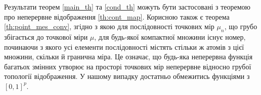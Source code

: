 Результати теорем \ref{main_th} та \ref{cond_th} можуть бути застосовані
з теоремою про неперервне відображення \ref{th:cont_map}. %
Корисною також є теорема \ref{th:point_mes_conv}, згідно з якою
для послідовності точкових мір $\mu_n$, що грубо збігається до точкової
міри $\mu$, для будь-якої компактної множини існує номер, 
починаючи з якого усі елементи послідовності містять
стільки ж атомів з цієї множини, скільки й гранична міра.
Це означає, що будь-яка неперервна функція багатьох змінних
утворює на просторі точкових мір
неперервне відносно грубої топології відображення. У нашому
випадку достатньо обмежитись функціями з $[0, 1]^p$.





